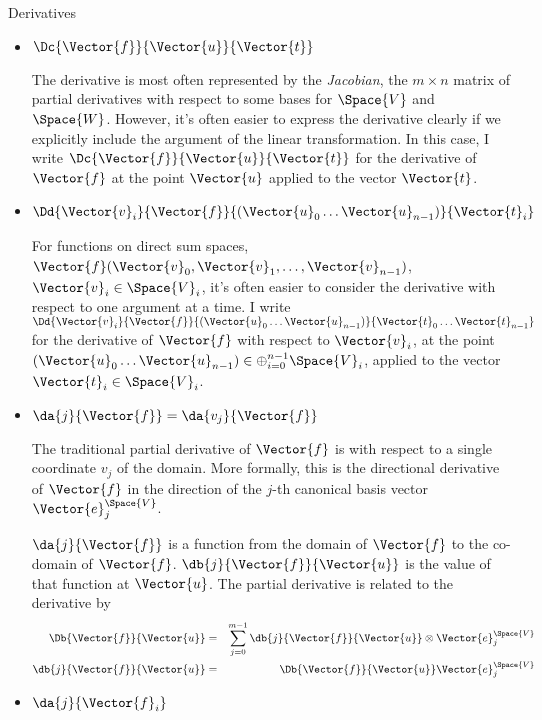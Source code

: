 \begin{plSection}{Derivatives}
\begin{itemize}
\item $\Dc{\Vector{f}}{\Vector{u}}{\Vector{t}}$

The derivative is most often represented by the \textit{Jacobian},
the $m \times n$ matrix of partial derivatives
with respect to some bases for $\Space{V}$ and $\Space{W}$.
However, it's often easier to express the derivative clearly if we
explicitly include the argument of the linear transformation.
In this case, I write $\Dc{\Vector{f}}{\Vector{u}}{\Vector{t}}$
for the derivative of $\Vector{f}$ at the point $\Vector{u}$
applied to the vector $\Vector{t}$.

\item $\Dd{\Vector{v}_i}{\Vector{f}}{(\Vector{u}_0 \ldots \Vector{u}_{n-1})}{\Vector{t}_i}$

For functions on direct sum spaces,
$\Vector{f}(\Vector{v}_0,\Vector{v}_1, \ldots, \Vector{v}_{n-1})$, $\Vector{v}_i \in \Space{V}_i$,
it's often easier to consider the derivative
with respect to one argument at a time.
I write $\Dd{\Vector{v}_i}{\Vector{f}}{(\Vector{u}_0 \ldots \Vector{u}_{n-1})}{\Vector{t}_0 \ldots \Vector{t}_{n-1}}$
for the derivative of $\Vector{f}$ with respect to $\Vector{v}_i$,
at the point $(\Vector{u}_0 \ldots \Vector{u}_{n-1}) \in \oplus_{i=0}^{n-1} \Space{V}_i$,
applied to the vector $\Vector{t}_i \in \Space{V}_i$.

\item $\da{j}{\Vector{f}} = \da{v_j}{\Vector{f}}$

The traditional partial derivative of $\Vector{f}$ is with respect to
a single coordinate $v_j$ of the domain.
More formally, this is the directional derivative of $\Vector{f}$
in the direction of the $j$-th canonical basis vector $\Vector{e}_j^{\Space{V}}$.

$\da{j}{\Vector{f}}$ is a function from the domain of $\Vector{f}$ to the co-domain of $\Vector{f}$.
$\db{j}{\Vector{f}}{\Vector{u}}$ is the value of that function at $\Vector{u}$.
The partial derivative is related to the derivative by
\begin{eqnarray}
\label{eq:partial-full-dervatives}
\Db{\Vector{f}}{\Vector{u}}
& = &
\sum_{j=0}^{m-1} \db{j}{\Vector{f}}{\Vector{u}} \otimes \Vector{e}_j^{\Space{V}}
\\
\db{j}{\Vector{f}}{\Vector{u}}
& = &
\Db{\Vector{f}}{\Vector{u}} \Vector{e}_j^{\Space{V}}
\nonumber
\end{eqnarray}

\item $\da{j}{\Vector{f}_i}$


\end{itemize}
\end{plSection}
